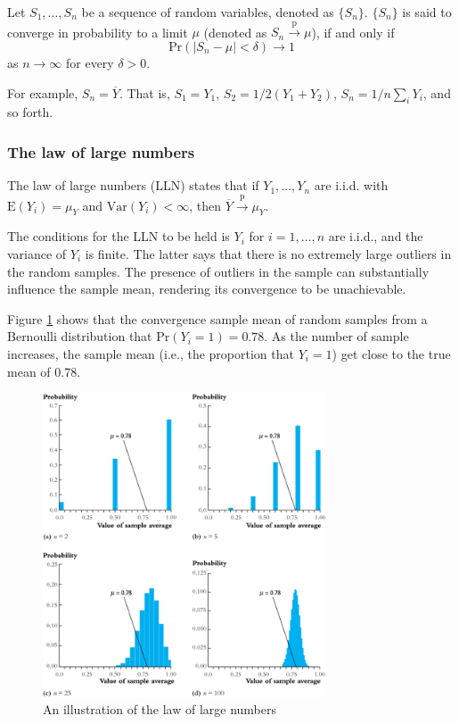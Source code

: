 \documentclass[a4paper,11pt]{article}
\begin{document}
Let \(S_1, \ldots, S_n\) be a sequence of random variables,
denoted as \(\{S_n\}\). \(\{S_n\}\) is said to converge in probability to a
limit \(\mu\) (denoted as \(S_n \xrightarrow{\text{p}} \mu\)), if and only if
\[ \mathrm{Pr} \left(|S_n-\mu| < \delta \right) \rightarrow 1 \]
as \(n \rightarrow \infty\) for every \(\delta > 0\).

For example, \(S_n = \overline{Y}\). That is, \(S_1=Y_1\), \(S_2=1/2(Y_1+Y_2)\),
\(S_n=1/n\sum_i Y_i\), and so forth.

\subsubsection*{The law of large numbers}
\label{sec:org04d7721}

The law of large numbers (LLN) states that if \(Y_1, \ldots, Y_n\) are i.i.d. with
\(\mathrm{E}(Y_i)=\mu_Y\) and \(\mathrm{Var}(Y_i) < \infty\), then
\(\overline{Y} \xrightarrow{\text{p}} \mu_Y\). 

The conditions for the LLN to be held is \(Y_i\) for \(i=1, \ldots, n\)
are i.i.d., and the variance of \(Y_i\) is finite. The latter says that
there is no extremely large outliers in the random samples. The
presence of outliers in the sample can substantially influence the
sample mean, rendering its convergence to be unachievable. 

Figure \ref{fig:org43f717b} shows that the convergence sample mean of random
samples from a Bernoulli distribution that \(\mathrm{Pr}(Y_i = 1) =
0.78\). As the number of sample increases, the sample mean (i.e., the
proportion that \(Y_i = 1\)) get close to the true mean of 0.78. 

\begin{figure}[htbp]
\centering
\includegraphics[width=0.75\textwidth]{figure/fig-2-8.png}
\caption{\label{fig:org43f717b}
An illustration of the law of large numbers}
\end{figure}
\end{document}
